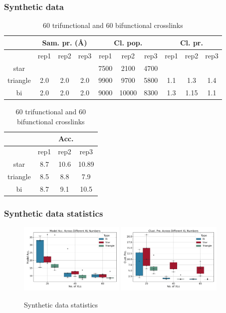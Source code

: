 \documentclass[a4paper,8pt]{beamer}
\begin{document}
\begin{frame}
  \frametitle{Synthetic data}
  \begin{table}[htbp]
    \centering
    \caption{60 trifunctional and 60 bifunctional crosslinks}
    \begin{tabular}{|c|ccc|ccc|ccc|}
        \hline
        & \multicolumn{3}{c|}{Sam. pr. ({\AA})} 
        & \multicolumn{3}{c|}{Cl. pop.} 
        & \multicolumn{3}{c|}{Cl. pr.} \\ \hline
        & rep1 & rep2 & rep3 
        & rep1 & rep2 & rep3 
        & rep1 & rep2 & rep3 \\ \hline
        star 
          &  &  &  
          & 7500  & 2100 & 4700
          &  &  & \\ \hline
        triangle 
          & 2.0 & 2.0 & 2.0
          & 9900 &  9700 & 5800 
          & 1.1  & 1.3 & 1.4 \\ \hline
        bi 
          & 2.0 & 2.0 & 2.0  
          & 9000 & 10000 & 8300 
          & 1.3 & 1.15 & 1.1  \\ \hline
    \end{tabular}
  \end{table}
  \begin{table}[htbp]
    \centering
    \caption{60 trifunctional and 60 bifunctional crosslinks}
    \begin{tabular}{|c|ccc|}
        \hline 
        & \multicolumn{3}{c|}{Acc.} \\ \hline
        & rep1 & rep2 & rep3 \\ \hline
        star 
          & 8.7  & 10.6 & 10.89 \\ \hline
        triangle 
          & 8.5 & 8.8 & 7.9 \\ \hline
        bi 
          & 8.7 & 9.1 &  10.5\\ \hline
    \end{tabular}
  \end{table}
  \end{frame}
%
\begin{frame}
  \frametitle{Synthetic data statistics}
  \begin{figure}
  \centering
  \includegraphics[width=0.45\textwidth]{test-figures/whisker_plot_model_acc.pdf}
  \includegraphics[width=0.45\textwidth]{test-figures/whisker_plot_clust_pre.pdf}
  \caption{Synthetic data statistics}
  \label{fig:synthetic_data_statistics}
  \end{figure}
  \end{frame}
\end{document}
